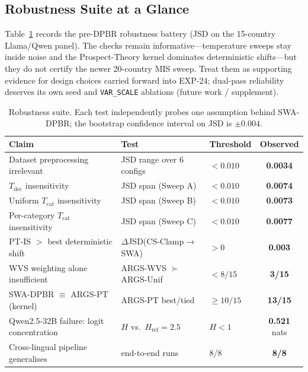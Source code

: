 \documentclass{article}
\begin{document}
\subsection{Robustness Suite at a Glance}
\label{sec:robustness}

Table~\ref{tab:robustness_summary} records the pre-DPBR robustness battery (JSD on
the 15-country Llama/Qwen panel). The checks remain informative---temperature sweeps
stay inside noise and the Prospect-Theory kernel dominates deterministic
shifts---but they do not certify the newer 20-country MIS sweep. Treat them as
supporting evidence for design choices carried forward into EXP-24; dual-pass
reliability deserves its own seed and \texttt{VAR\_SCALE} ablations (future work /
supplement).

\begin{table}[h]\centering\small
\caption{Robustness suite. Each test independently probes one assumption
behind SWA-DPBR; the bootstrap confidence interval on JSD is $\pm 0.004$.}
\label{tab:robustness_summary}
\setlength{\tabcolsep}{4pt}
\begin{tabular}{lllc}\toprule
Claim & Test & Threshold & Observed \\\midrule
Dataset preprocessing irrelevant & JSD range over 6 configs & $<\!0.010$ & \textbf{0.0034} \\
$T_\text{dec}$ insensitivity & JSD span (Sweep A) & $<\!0.010$ & \textbf{0.0074} \\
Uniform $T_\text{cat}$ insensitivity & JSD span (Sweep B) & $<\!0.010$ & \textbf{0.0073} \\
Per-category $T_\text{cat}$ insensitivity & JSD span (Sweep C) & $<\!0.010$ & \textbf{0.0077} \\
PT-IS $>$ best deterministic shift & $\Delta$JSD(CS-Clamp$\to$SWA) & $>\!0$ & \textbf{0.003} \\
WVS weighting alone insufficient & ARGS-WVS $\succ$ ARGS-Unif & $<\!8/15$ & \textbf{3/15} \\
SWA-DPBR $\equiv$ ARGS-PT (kernel) & ARGS-PT best/tied & $\ge 10/15$ & \textbf{13/15} \\
Qwen2.5-32B failure: logit concentration & $H$ vs.\ $H_\text{ref}{=}2.5$ & $H{<}1$ & \textbf{0.521} nats \\
Cross-lingual pipeline generalises & end-to-end runs & 8/8 & \textbf{8/8} \\\bottomrule
\end{tabular}
\end{table}

\end{document}
